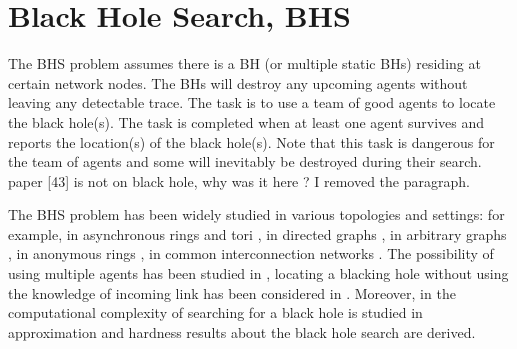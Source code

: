 \section{Black Hole Search, BHS}
The BHS problem assumes there is a BH (or multiple static BHs) residing at certain network nodes. The BHs will destroy any upcoming agents without leaving any detectable trace. The task is to use a team of good agents to locate the black hole(s). The task is completed when at least one agent survives and reports the location(s) of the black hole(s). Note that this task is dangerous for the team of agents and some will inevitably  be destroyed during their search.  
\color{blue}
paper [43] is not on black hole, why was it here ?  I removed the paragraph.
\color{black}

The BHS problem has been widely studied in various topologies and settings: 
for example,  in asynchronous rings and tori  \cite{das1,das2}, in directed graphs \cite{czyz},  in arbitrary graphs  \cite{dobr},  in anonymous rings  \cite{dobr3},  in common interconnection networks   \cite{dobr2}.
 The possibility of using multiple agents has been studied in  \cite{coop}, 
  locating a blacking hole without using the knowledge of incoming link has been considered in  \cite{glau}.
Moreover,  in  \cite{czyz1}   the computational complexity of searching for a black hole is studied
 in   \cite{klas,klas1}     approximation   and hardness results about the black hole search are derived.

